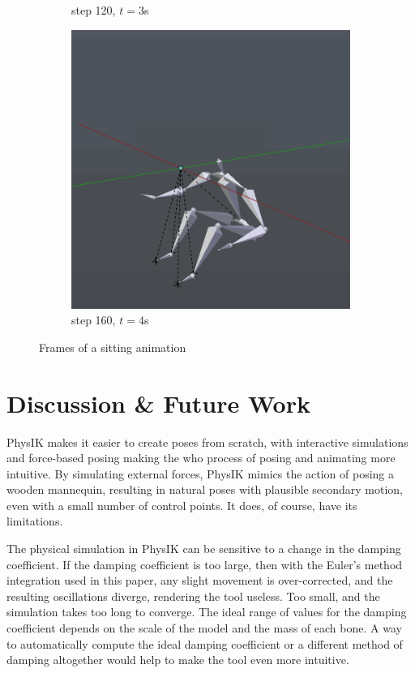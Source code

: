 \documentclass[10pt,twocolumn,letterpaper]{article}
\begin{document}
\begin{figure}
\begin{subfigure}{0.2\textwidth}
        \caption{step 120, $t=3$s}
    \end{subfigure}\begin{subfigure}{0.2\textwidth}
        \centering
        \includegraphics[width=.9\linewidth]{sit-4.png}
        \caption{step 160, $t=4$s}
    \end{subfigure}

    \caption{Frames of a sitting animation}
    \label{img:sit}
\end{figure}

\section{Discussion \& Future Work}

PhysIK makes it easier to create poses from scratch, with interactive simulations and force-based posing making the who process of posing and animating more intuitive. By simulating external forces, PhysIK mimics the action of posing a wooden mannequin, resulting in natural poses with plausible secondary motion, even with a small number of control points. It does, of course, have its limitations.

The physical simulation in PhysIK can be sensitive to a change in the damping coefficient. If the damping coefficient is too large, then with the Euler's method integration used in this paper, any slight movement is over-corrected, and the resulting oscillations diverge, rendering the tool useless. Too small, and the simulation takes too long to converge. The ideal range of values for the damping coefficient depends on the scale of the model and the mass of each bone. A way to automatically compute the ideal damping coefficient or a different method of damping altogether would help to make the tool even more intuitive. 
\end{document}
